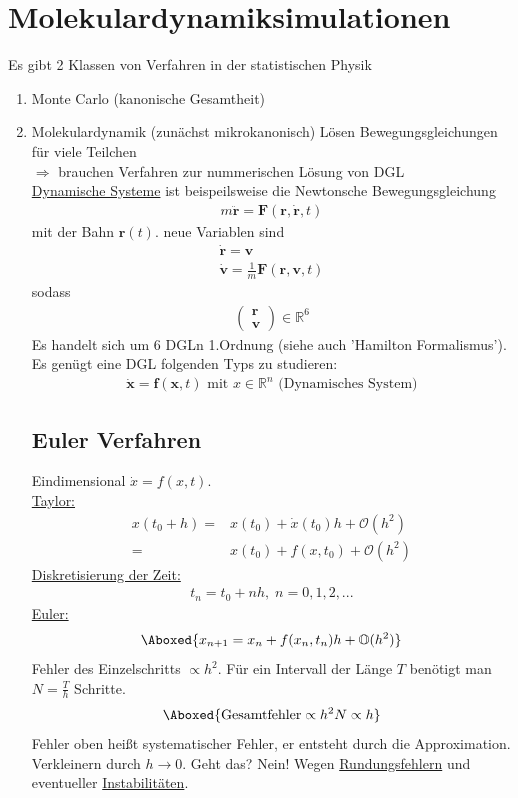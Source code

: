 \documentclass[12pt]{article}
\begin{document}
\section{Molekulardynamiksimulationen}
Es gibt 2 Klassen von Verfahren in der statistischen Physik 
\begin{enumerate}
\item Monte Carlo (kanonische Gesamtheit)
\item Molekulardynamik (zunächst mikrokanonisch)
Lösen Bewegungsgleichungen für viele Teilchen \\
$\Rightarrow$ brauchen Verfahren zur nummerischen Lösung von DGL \\
\underline{Dynamische Systeme} ist beispeilsweise die Newtonsche Bewegungsgleichung \begin{align}
m \ddot{\textbf{r}} = \mathbf{F} (\mathbf{r}, \dot{\mathbf{r}}, t)
\end{align} mit der Bahn $\mathbf{r}(t)$.
neue Variablen sind \begin{align*}
\dot{\mathbf{r}}= \mathbf{v} \\
\dot{\mathbf{v}} = \frac{1}{m} \mathbf{F}(\mathbf{r}, \mathbf{v},t) 
\end{align*}
sodass 
\begin{align*}
\begin{pmatrix}\mathbf{r}\\ \mathbf{v}\end{pmatrix} \in \mathbb{R}^6
\end{align*}
Es handelt sich um 6 DGLn 1.Ordnung (siehe auch 'Hamilton Formalismus'). Es genügt eine DGL folgenden Typs zu studieren: 
\begin{align}
\dot{\mathbf{x}}= \mathbf{f}( \mathbf{x},t) \mbox{  mit  } x \in \mathbb{R}^n \mbox{   (Dynamisches System)}
\end{align}
\subsection{Euler Verfahren}
Eindimensional $\dot{x}= f(x,t)$.\\  %
\underline{Taylor:}
\begin{align}
x(t_0 +h)=& x(t_0) + \dot{x}(t_0)h+ \mathcal{O} (h^2) \\
=& x(t_0) + f(x,t_0) + \mathcal{O} (h^2)
\end{align}
\underline{Diskretisierung der Zeit:}
\begin{align}
t_n = t_0 + nh, \; n=0,1,2,...
\end{align}
\underline{Euler:}
\begin{align}
\Aboxed{ x_{n+1}= x_n + f(x_n, t_n)h+ \mathbb{O}(h^2)}
\end{align}
Fehler des Einzelschritts $\propto h^2$. Für ein Intervall der Länge $T$ benötigt man $N= \frac{T}{h}$ Schritte.
\begin{align}
\Aboxed{ \mbox{Gesamtfehler} \propto h^2 N \propto h }
\end{align}
Fehler oben heißt systematischer Fehler, er entsteht durch die Approximation. Verkleinern durch $h \to 0$. Geht das? Nein! Wegen \underline{Rundungsfehlern} und eventueller \underline{Instabilitäten}.
\end{enumerate}
\end{document}
